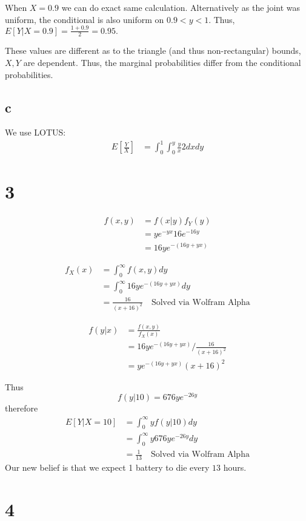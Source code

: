 \documentclass[10pt]{article}
\begin{document}
When $X=0.9$ we can do exact same calculation. Alternatively as the joint was uniform, the conditional is also uniform on $0.9<y<1.$ Thus, $E[Y|X=0.9]=\frac{1+0.9}{2}=0.95.$

These values are different as to the triangle (and thus non-rectangular) bounds, $X,Y$ are dependent. Thus, the marginal probabilities differ from the conditional probabilities.

\subsection*{c}

We use LOTUS:
\begin{align*}
    E\left[\frac{Y}{X}\right] &= \int_0^1\int_0^y \frac{y}{x}2dxdy
\end{align*}

\section*{3}
\begin{align*}
    f(x,y) &= f(x|y)f_Y(y)\\
    &= ye^{-yx}16e^{-16y}\\
    &= 16ye^{-(16y+yx)}
\end{align*}

\begin{align*}
    f_X(x) &= \int_0^\infty f(x,y)dy\\
    &= \int_0^\infty 16ye^{-(16y+yx)}dy\\ %
    &= \frac{16}{(x+16)^2}\quad\text{Solved via Wolfram Alpha}
\end{align*}

\begin{align*}
    f(y|x) &= \frac{f(x,y)}{f_X(x)}\\
    &= 16ye^{-(16y+yx)}/\frac{16}{(x+16)^2}\\
    &=ye^{-(16y+yx)}(x+16)^2
\end{align*}

Thus
\[f(y|10) = 676ye^{-26y}\]
therefore
\begin{align*}
    E[Y|X=10] &= \int_0^\infty yf(y|10)dy\\
    &=\int_0^\infty y676ye^{-26y}dy\\
    &= \frac{1}{13}\quad \text{Solved via Wolfram Alpha}
\end{align*}
Our new belief is that we expect 1 battery to die every $13$ hours.

\section*{4}
\end{document}
